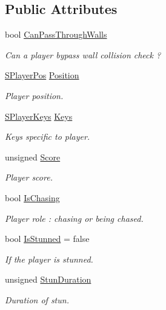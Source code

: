 \subsection*{Public Attributes}
\begin{DoxyCompactItemize}
\item 
bool \hyperlink{struct_chase_game_1_1_s_player_state_acd7030969c414605901e551171078bb1}{Can\-Pass\-Through\-Walls}
\begin{DoxyCompactList}\small\item\em Can a player bypass wall collision check ? \end{DoxyCompactList}\item 
\hyperlink{struct_chase_game_1_1_s_player_pos}{S\-Player\-Pos} \hyperlink{struct_chase_game_1_1_s_player_state_a0a68b95a4255f2a543675f88b00847b4}{Position}
\begin{DoxyCompactList}\small\item\em Player position. \end{DoxyCompactList}\item 
\hyperlink{struct_chase_game_1_1_s_player_keys}{S\-Player\-Keys} \hyperlink{struct_chase_game_1_1_s_player_state_a3fc9ce0322ed28ff9c401983d91c69f2}{Keys}
\begin{DoxyCompactList}\small\item\em Keys specific to player. \end{DoxyCompactList}\item 
unsigned \hyperlink{struct_chase_game_1_1_s_player_state_a268594c795a70cf1eb9fe6061bfa57d0}{Score}
\begin{DoxyCompactList}\small\item\em Player score. \end{DoxyCompactList}\item 
bool \hyperlink{struct_chase_game_1_1_s_player_state_a2574de666d4744daefd7824b1c3c809f}{Is\-Chasing}
\begin{DoxyCompactList}\small\item\em Player role \-: chasing or being chased. \end{DoxyCompactList}\item 
bool \hyperlink{struct_chase_game_1_1_s_player_state_a83d45366d7024b55d2e05ca8338846a0}{Is\-Stunned} = false
\begin{DoxyCompactList}\small\item\em If the player is stunned. \end{DoxyCompactList}\item 
unsigned \hyperlink{struct_chase_game_1_1_s_player_state_afc3caabd0eb284f7bfdddae63ac86da7}{Stun\-Duration}
\begin{DoxyCompactList}\small\item\em Duration of stun. \end{DoxyCompactList}\end{DoxyCompactItemize}


